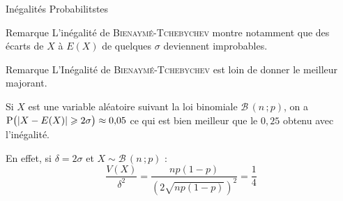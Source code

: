 \documentclass{coursbook}
\begin{document}
\begin{Gpartie}{Inégalités Probabilitstes}
\begin{Spartie}{Remarque}
            L'inégalité de \textsc{Bienaymé-Tchebychev} montre notamment que des écarts de $X$ à $E(X)$ de quelques $\sigma$ deviennent improbables.
        \end{Spartie}
        \begin{Spartie}{Remarque} 
            L'Inégalité de \textsc{Bienaymé-Tchebychev} est loin de donner le meilleur majorant.

            Si $X$ est une variable aléatoire suivant la loi binomiale $\mathcal{B}\,\left(n\,; p\right)$, on a \\ $\mathrm{P}\big(\vert X-E(X)\rvert\geqslant 2\sigma\big)\approx 0{,}05$ ce qui est bien meilleur que le $0{,}25$ obtenu avec l'inégalité.

            En effet, si $\delta=2\sigma$ et $X\sim\mathcal{B}\,\left(n\,; p\right)$ : \[\frac{V(X)}{\delta^2}=\frac{np(1-p)}{\left(2\sqrt{np(1-p)}\right)^2}=\frac{1}{4}\]
        \end{Spartie}
    \end{Gpartie}
    \vfill
    \pagebreak
\end{document}
